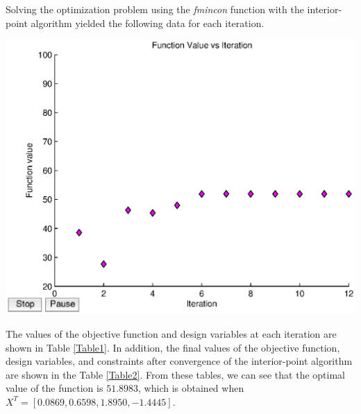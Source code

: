 \documentclass[11pt]{article}
\begin{document}

\begin{problem}{1}
\end{problem}
\begin{solution}

\end{solution}
Solving the optimization problem using the \emph{fmincon} function with the interior-point algorithm yielded the following data for each iteration.

\begin{center}
\includegraphics[scale=0.75]{problem1/problem1.eps}
\end{center}

The values of the objective function and design variables at each iteration are shown in Table \ref{Table1}. In addition, the final values of the objective function, design variables, and constraints after convergence of the interior-point algorithm are shown in the Table \ref{Table2}. From these tables, we can see that the optimal value of the function is $51.8983$, which is obtained when $X^T = [0.0869, 0.6598, 1.8950, -1.4445]$.
\end{document}
